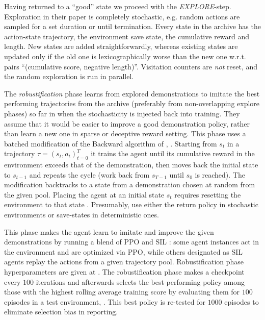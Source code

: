 \documentclass{article}
\begin{document}
Having returned to a ``good'' state we proceed with the \emph{EXPLORE}-step.
%
Exploration in their paper is completely stochastic, e.g. random actions are sampled
for a set duration or until termination. Every state in the archive has the action-state
trajectory, the environment save state, the cumulative reward and length. New states
are added straightforwardly, whereas existing states are updated only if the old one
is lexicographically worse than the new one w.r.t. pairs ``(cumulative score, negative
length)''. Visitation counters are \emph{not} reset, and the random exploration is run in parallel.

The \emph{robustification} phase learns from explored demonstrations to imitate the best
performing trajectories from the archive (preferably from non-overlapping explore phases)
so far in when the stochasticity is injected back into training. They assume that it would
be easier to improve a good demonstration policy, rather than learn a new one in sparse
or deceptive reward setting.
% 
%
This phase uses a batched modification of the Backward algorithm of \citet{salimans_learning_2018},
\citep[app.~A.7]{ecoffet_go-explore_2021}.
%
Starting from $s_t$ in a trajectory $\tau = (s_t, a_t)_{t=0}^T$ it trains the agent until
its cumulative reward in the environment exceeds that of the demonstration, then moves back
the initial state to $s_{t-1}$ and repeats the cycle (work back from $s_{T-1}$ until $s_0$
is reached). The modification backtracks to a state from a demonstration chosen at random
from the given pool.
Placing the agent at an initial state $s_t$ requires resetting the environment to that state
\citep[L.~28 of alg.~1]{salimans_learning_2018}. Presumably, \citep{ecoffet_first_2021} use
either the return policy in stochastic environments or save-states in deterministic ones.

This phase makes the agent learn to imitate and improve the given demonstrations by running
a blend of PPO \citep{schulman_proximal_2017} and SIL \citep{oh_self-imitation_2018}: some
agent instances act in the environment and are optimized via PPO, while others designated
as SIL agents replay the actions from a given trajectory pool. Robustification phase
hyperparameters are given at \citep[p.~30]{ecoffet_first_2021}.
%
%
The robustification phase makes a checkpoint every $100$ iterations and afterwards selects
the best-performing policy among those with the highest rolling average training score
by evaluating them for $100$ episodes in a test environment, \citep{ecoffet_first_2021}.
This best policy is re-tested for $1000$ episodes to eliminate selection bias in reporting.
\end{document}
